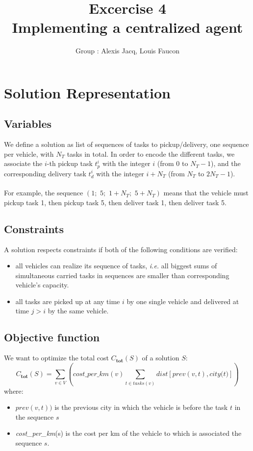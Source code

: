 \documentclass[11pt]{article}
\title{\bf Excercise 4\\ Implementing a centralized agent}
\author{Group \textnumero 10: Alexis Jacq, Louis Faucon}
\begin{document}
\maketitle

\section{Solution Representation}

\subsection{Variables}
We define a solution as list of sequences of tasks to pickup/delivery, one sequence per vehicle, with $N_T$ tasks in total. In order to encode the different tasks, we associate the $i$-th pickup task $t_p^i$ with the integer $i$ (from $0$ to $N_T-1$), and the corresponding delivery task $t_d^i$ with the integer $i+N_T$ (from $N_T$ to $2N_T-1$). \\
\\
For example, the sequence $(1;\,\,5;\,\,1+N_T;\,\,5+N_T)$ means that the vehicle must pickup task 1, then pickup task 5, then deliver task 1, then deliver task 5.\\

\subsection{Constraints}
A solution respects constraints if both of the following conditions are verified:\\
\begin{itemize}[noitemsep,nolistsep]
\item all vehicles can realize its sequence of tasks, \textit{i.e.} all biggest sums of simultaneous carried tasks in sequences are smaller than corresponding vehicle's capacity.\\
\item all tasks are picked up at any time $i$ by one single vehicle and delivered at time $j>i$ by the same vehicle.
\end{itemize}

\subsection{Objective function}
We want to optimize the total cost $C_\textbf{tot}(S)$ of a solution $S$:
$$C_\textbf{tot}(S) = \sum\limits_{v \in V} ( \textit{cost\_per\_km}(v) \sum\limits_{t \in tasks(v)} \textit{dist}\left[prev(v,t),\textit{city(t)}\right] )$$
where:
\begin{itemize}[noitemsep,nolistsep]
\item $prev(v,t))$ is the previous city in which the vehicle is before the task $t$ in the sequence $s$
\item \textit{cost\_per\_km}(s) is the cost per km of the vehicle to which is associated the sequence $s$.
\end{itemize}
\end{document}
